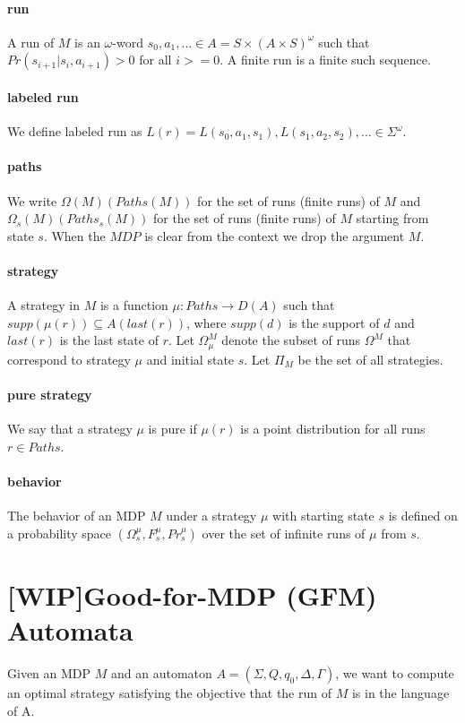 \documentclass[
	digital
nolof, nolot
]{fithesis3}
\begin{document}
		\paragraph{run}
		A run of $M$ is an $\omega$-word 
		$s_0,a_1,...\in A=S \times (A \times S)^\omega$
		such that $Pr(s_{i+1}|s_i, a_{i+1})>0$ for all $i >= 0$. A finite run is a finite such sequence.
		\paragraph{labeled run}
		We define labeled run as
		$L(r)=L(s_0,a_1,s_1), L(s_1, a_2, s_2),... \in \Sigma^\omega$.
		\paragraph{paths}
		We write $\Omega(M)(Paths(M))$
		for the set of runs (finite runs) of $M$ and
		$\Omega_s(M)(Paths_s(M))$ for the set of runs (finite runs)
		of $M$ starting from state $s$. When the $MDP$ is clear from the context we drop the argument $M$.
		\paragraph{strategy}
		A strategy in $M$ is a
		function $\mu:Paths \rightarrow D(A)$
		such that $supp(\mu(r))\subseteq A(last(r))$,
		where $supp(d)$ is the support of $d$ and
		$last(r)$ is the last state of $r$.
		Let $\Omega^M_\mu$ denote the subset of runs $\Omega^M$
		that correspond to strategy $\mu$ and initial state $s$.
		Let $\Pi_M$ be the set of all strategies.
		\paragraph{pure strategy}
		We say that a strategy $\mu$ is pure
		if $\mu(r)$ is a point distribution for all runs $r \in Paths$.
		\paragraph{behavior}
		The behavior of an MDP $M$
		under a strategy $\mu$ with starting state $s$ is defined
		on a probability space $(\Omega_s^\mu, F_s^\mu, Pr_s^\mu)$
		over the set of infinite runs of $\mu$ from $s$.
		
		\section{[WIP]Good-for-MDP (GFM) Automata}
		Given an MDP $M$ and an
		automaton $A=(\Sigma, Q, q_0, \Delta, \Gamma)$, we want to compute an optimal strategy satisfying the objective that the run of $M$
		is in the language of A.
\end{document}
